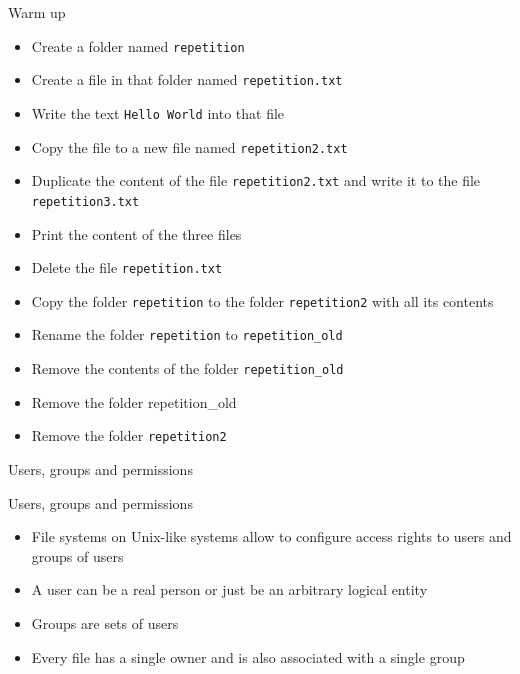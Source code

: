 \documentclass[aspectratio=1610]{beamer}
\newcommand\curtitle{}
\begin{document}
\begin{frame}[c]{Warm up}
    \begin{itemize}
        \item [\leftpointright] Create a folder named \texttt{repetition}
        \item [\leftpointright] Create a file in that folder named \texttt{repetition.txt}
        \item [\leftpointright] Write the text \texttt{Hello World} into that file
        \item [\leftpointright] Copy the file to a new file named \texttt{repetition2.txt}
        \item [\leftpointright] Duplicate the content of the file \texttt{repetition2.txt} and write it to the file \texttt{repetition3.txt}
        \item [\leftpointright] Print the content of the three files
        \item [\leftpointright] Delete the file \texttt{repetition.txt}
        \item [\leftpointright] Copy the folder \texttt{repetition} to the folder \texttt{repetition2} with all its contents
        \item [\leftpointright] Rename the folder \texttt{repetition} to \texttt{repetition\_old}
        \item [\leftpointright] Remove the contents of the folder \texttt{repetition\_old}
        \item [\leftpointright] Remove the folder repetition\_old
        \item [\leftpointright] Remove the folder \texttt{repetition2}
    \end{itemize}
\end{frame}

\begin{frame}[c]
    \Huge Users, groups and permissions
\end{frame}


\renewcommand\curtitle{Users, groups and permissions}

\begin{frame}[c]{\curtitle}
    \begin{itemize}[<+->]
        \setlength\itemsep{1em}
        \item File systems on Unix-like systems allow to configure access rights to users and groups
            of users
        \item A user can be a real person or just be an arbitrary logical entity
        \item Groups are sets of users
        \item Every file has a single \alert{owner} and is also associated with a single
            \alert{group}
    \end{itemize}
\end{frame}
\end{document}

